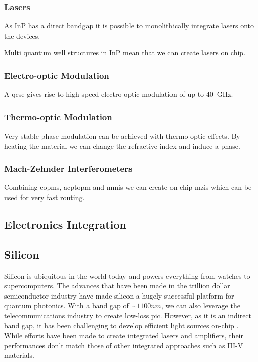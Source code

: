 \subsubsection*{Lasers}

As \ac{InP} has a direct bandgap it is possible to monolithically integrate lasers onto the devices. 

Multi quantum well structures in \ac{InP} mean that we can create lasers on chip.

\subsubsection*{Electro-optic Modulation}

A \ac{qcse} gives rise to high speed electro-optic modulation of up to \SI{40}{GHz}.

\subsubsection*{Thermo-optic Modulation}

Very stable phase modulation can be achieved with thermo-optic effects. By heating the material we can change the refractive index and induce a phase.

\subsubsection*{Mach-Zehnder Interferometers}

Combining \acp{eopm}, acp{topm} and \acp{mmi} we can create on-chip \acp{mzi} which can be used for very fast routing. 

\subsection*{Electronics Integration}

\subsection{Silicon}

Silicon is ubiquitous in the world today and powers everything from watches to supercomputers. The advances that have been made in the trillion dollar semiconductor industry have made silicon a hugely successful platform for quantum photonics. With a band gap of $\sim 1100nm$, we can also leverage the telecommunications industry to create low-loss \acl{pic}. However, as it is an indirect band gap, it has been challenging to develop efficient light sources on-chip \cite{}. While efforts have been made to create integrated lasers and amplifiers, their performances don't match those of other integrated approaches such as III-V materials.

